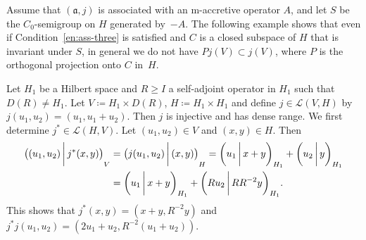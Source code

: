 \documentclass[a4paper,oneside,12pt]{amsart}
\theoremstyle{plain}
\theoremstyle{definition}
\newenvironment{example}
{\pushQED{\qed}

\examplex}
{\popQED\endexamplex}
\let\ge=\geqslant
\begin{document}
Assume that $({{\mathfrak{{a}}}},j)$ is associated with an {\ensuremath{\text{m}}}-accretive operator $A$,
and let $S$ be the $C_0$-semigroup on $H$ generated by~$-A$. 
The following example shows that even if Condition~\ref{en:ass-three} is satisfied and $C$ is a closed subspace of $H$ that is invariant under $S$, in general we do not have 
$Pj(V)\subset j(V)$, where $P$ is the orthogonal projection onto $C$ in~$H$. 
\begin{example}\label{ex:invar-bad-cond3}
Let $H_1$ be a Hilbert space and $R\ge I$ a self-adjoint operator in $H_1$ such that $D(R)\ne H_1$.
Let $V\coloneqq H_1\times D(R)$, $H\coloneqq H_1\times H_1$ and define $j\in{\mathcal{L}}(V,H)$ by $j(u_1,u_2)=(u_1,u_1+u_2)$.
Then $j$ is injective and has dense range.
We first determine $j^*\in{\mathcal{L}}(H,V)$. Let $(u_1,u_2)\in V$ and $(x,y)\in H$. Then
\begin{align*}
    {{\ifthenelse{\equal{b}{auto}}{\left({(u_1,u_2)}\mkern3mu{\biggm|}\mkern3mu {j^*(x,y)}\right)}{}
\ifthenelse{\equal{b}{b}}{\bigl({(u_1,u_2)}\mkern3mu{\biggm|}\mkern3mu {j^*(x,y)}\bigr)}{}
\ifthenelse{\equal{b}{B}}{\Bigl({(u_1,u_2)}\mkern3mu{\bigm|}\mkern3mu {j^*(x,y)}\Bigr)}{}
}}_V &= {{\ifthenelse{\equal{b}{auto}}{\left({j(u_1,u_2)}\mkern3mu{\biggm|}\mkern3mu {(x,y)}\right)}{}
\ifthenelse{\equal{b}{b}}{\bigl({j(u_1,u_2)}\mkern3mu{\biggm|}\mkern3mu {(x,y)}\bigr)}{}
\ifthenelse{\equal{b}{B}}{\Bigl({j(u_1,u_2)}\mkern3mu{\bigm|}\mkern3mu {(x,y)}\Bigr)}{}
}}_H 
    ={{\ifthenelse{\equal{auto}{auto}}{\left({u_1}\mkern3mu{\biggm|}\mkern3mu {x+y}\right)}{}
\ifthenelse{\equal{auto}{b}}{\bigl({u_1}\mkern3mu{\biggm|}\mkern3mu {x+y}\bigr)}{}
\ifthenelse{\equal{auto}{B}}{\Bigl({u_1}\mkern3mu{\bigm|}\mkern3mu {x+y}\Bigr)}{}
}}_{H_1} + {{\ifthenelse{\equal{auto}{auto}}{\left({u_2}\mkern3mu{\biggm|}\mkern3mu {y}\right)}{}
\ifthenelse{\equal{auto}{b}}{\bigl({u_2}\mkern3mu{\biggm|}\mkern3mu {y}\bigr)}{}
\ifthenelse{\equal{auto}{B}}{\Bigl({u_2}\mkern3mu{\bigm|}\mkern3mu {y}\Bigr)}{}
}}_{H_1} \\
    &= {{\ifthenelse{\equal{auto}{auto}}{\left({u_1}\mkern3mu{\biggm|}\mkern3mu {x+y}\right)}{}
\ifthenelse{\equal{auto}{b}}{\bigl({u_1}\mkern3mu{\biggm|}\mkern3mu {x+y}\bigr)}{}
\ifthenelse{\equal{auto}{B}}{\Bigl({u_1}\mkern3mu{\bigm|}\mkern3mu {x+y}\Bigr)}{}
}}_{H_1} + {{\ifthenelse{\equal{auto}{auto}}{\left({Ru_2}\mkern3mu{\biggm|}\mkern3mu {RR^{-2}y}\right)}{}
\ifthenelse{\equal{auto}{b}}{\bigl({Ru_2}\mkern3mu{\biggm|}\mkern3mu {RR^{-2}y}\bigr)}{}
\ifthenelse{\equal{auto}{B}}{\Bigl({Ru_2}\mkern3mu{\bigm|}\mkern3mu {RR^{-2}y}\Bigr)}{}
}}_{H_1}.
\end{align*}
This shows that $j^*(x,y)=(x+y,R^{-2}y)$ and $j^*j(u_1,u_2)=(2u_1+u_2,R^{-2}(u_1+u_2))$.


\end{example}
\end{document}

